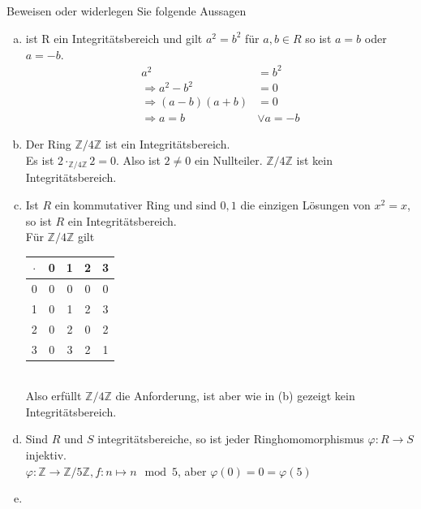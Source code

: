 \documentclass{article}
\newcommand{\Z}{\mathbb{Z}}
\begin{document}
\subsection{}
\color{blue}
Beweisen oder widerlegen Sie folgende Aussagen
\color{black}
\begin{enumerate}[(a)]
    \item
        \color{blue}
        ist R ein Integritätsbereich und gilt $a^2=b^2$ für
        $a,b\in R$ so ist $a=b$ oder $a=-b$.\\
        \color{black}
        \begin{align*}
            a^2&=b^2\\
            \Rightarrow a^2-b^2&=0\\
            \Rightarrow (a-b)(a+b)&=0\\
            \Rightarrow a=b&\lor a=-b
        \end{align*}
    \item
        \color{blue}
        Der Ring $\Z/4\Z$ ist ein Integritätsbereich.\\
        \color{black}
        Es ist $2\cdot_{\Z/4\Z}2=0$. Also ist $2\neq 0$
        ein Nullteiler. $\Z/4\Z$ ist kein
        Integritätsbereich.
    \item
        \color{blue}
        Ist $R$ ein kommutativer Ring und sind $0,1$ die
        einzigen Lösungen von $x^2=x$, so
        ist $R$ ein Integritätsbereich.\\
        \color{black}
        Für $\Z/4\Z$ gilt\\
        \begin{tabular}{c|cccc}
            $\cdot$&0&1&2&3\\
            \hline
            0&0&0&0&0\\
            1&0&1&2&3\\
            2&0&2&0&2\\
            3&0&3&2&1\\
        \end{tabular}\\
        Also erfüllt $\Z/4\Z$ die Anforderung,
        ist aber wie in (b) gezeigt kein Integritätsbereich.
    \item
        \color{blue}
        Sind $R$ und $S$ integritätsbereiche,
        so ist jeder Ringhomomorphismus
        $\varphi:R\rightarrow S$ injektiv.\\
        \color{black}
        $\varphi:\Z\rightarrow\Z/5\Z, f:n\mapsto n\mod 5$,
        aber $\varphi(0)=0=\varphi(5)$
    \item

\end{enumerate}
\end{document}
